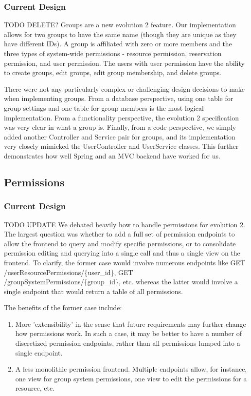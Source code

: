 \documentclass[12pt]{article}
\begin{document}
\subsubsection{Current Design}
{\huge TODO DELETE?}
Groups are a new evolution 2 feature. Our implementation allows for two groups to have the same name (though they are unique as they have different IDs). A group is affiliated with zero or more members and the three types of system-wide permissions - resource permission, reservation permission, and user permission. The users with user permission have the ability to create groups, edit groups, edit group membership, and delete groups. 

There were not any particularly complex or challenging design decisions to make when implementing groups. From a database perspective, using one table for group settings and one table for group members is the most logical implementation. From a functionality perspective, the evolution 2 specification was very clear in what a group is. Finally, from a code perspective, we simply added another Controller and Service pair for groups, and its implementation very closely mimicked the UserController and UserService classes. This further demonstrates how well Spring and an MVC backend have worked for us. 


\subsection{Permissions}
\subsubsection{Current Design}
{\huge TODO UPDATE}
We debated heavily how to handle permissions for evolution 2. The largest question was whether to add a full set of permission endpoints to allow the frontend to query and modify specific permissions, or to consolidate permission editing and querying into a single call and thus a single view on the frontend. To clarify, the former case would involve numerous endpoints like GET /userResourcePermissions/\{user\_id\}, GET /groupSystemPermissions/\{group\_id\}, etc. whereas the latter would involve a single endpoint that would return a table of all permissions. 

The benefits of the former case include:
\begin{enumerate}
    \item More 'extensibility' in the sense that future requirements may further change how permissions work. In such a case, it may be better to have a number of discretized permission endpoints, rather than all permissions lumped into a single endpoint. 
    \item A less monolithic permission frontend. Multiple endpoints allow, for instance, one view for group system permissions, one view to edit the permissions for a resource, etc. 
\end{enumerate}
\end{document}
